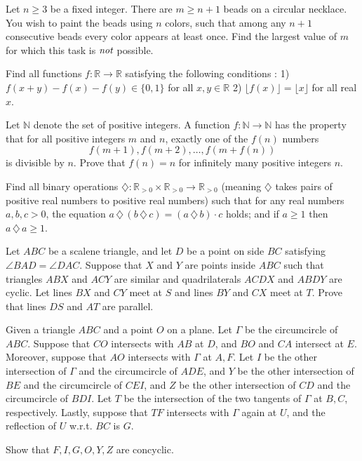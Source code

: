 \documentclass[11pt]{scrartcl}
\begin{document}
\begin{problem}[822921222405372]
Let $n\ge 3$ be a fixed integer. There are $m\ge n+1$ beads on a circular necklace. You wish to paint the beads using $n$ colors, such that among any $n+1$ consecutive beads every color appears at least once. Find the largest value of $m$ for which this task is $\emph{not}$ possible.
\end{problem}
\begin{problem}[549237375256018]
Find all functions $f : \mathbb{R} \rightarrow \mathbb{R}$ satisfying the following conditions :
1) $f(x+y)-f(x)-f(y) \in \{0,1\} $ for all $x,y \in \mathbb{R}$
2) $\lfloor f(x) \rfloor = \lfloor x \rfloor $ for all real $x$.
\end{problem}
\begin{problem}[1598288382590173390]
Let $\mathbb N$ denote the set of positive integers. A function $f\colon\mathbb N\to\mathbb N$ has the property that for all positive integers $m$ and $n$, exactly one of the $f(n)$ numbers
\[f(m+1),f(m+2),\ldots,f(m+f(n))\]is divisible by $n$. Prove that $f(n)=n$ for infinitely many positive integers $n$.
\end{problem}
\begin{problem}[2694660444585153591]
Find all binary operations $\diamondsuit: \mathbb R_{>0}\times \mathbb R_{>0}\to \mathbb R_{>0}$ (meaning $\diamondsuit$ takes pairs of positive real numbers to positive real numbers) such that for any real numbers $a, b, c > 0$,
the equation $a\,\diamondsuit\, (b\,\diamondsuit \,c) = (a\,\diamondsuit \,b)\cdot c$ holds; and
if $a\ge 1$ then $a\,\diamondsuit\, a\ge 1$.
\end{problem}
\begin{problem}[736821043753990]
Let $ABC$ be a scalene triangle, and let $D$ be a point on side $BC$ satisfying $\angle BAD=\angle DAC$. Suppose that $X$ and $Y$ are points inside $ABC$ such that triangles $ABX$ and $ACY$ are similar and quadrilaterals $ACDX$ and $ABDY$ are cyclic. Let lines $BX$ and $CY$ meet at $S$ and lines $BY$ and $CX$ meet at $T$. Prove that lines $DS$ and $AT$ are parallel.
\end{problem}
\begin{problem}[2003233604438068678]
Given a triangle $ABC$ and a point $O$ on a plane. Let $\Gamma$ be the circumcircle of $ABC$. Suppose that $CO$ intersects with $AB$ at $D$, and $BO$ and $CA$ intersect at $E$. Moreover, suppose that $AO$ intersects with $\Gamma$ at $A,F$. Let $I$ be the other intersection of $\Gamma$ and the circumcircle of $ADE$, and $Y$ be the other intersection of $BE$ and the circumcircle of $CEI$, and $Z$ be the other intersection of $CD$ and the circumcircle of $BDI$. Let $T$ be the intersection of the two tangents of $\Gamma$ at $B,C$, respectively. Lastly, suppose that $TF$ intersects with $\Gamma$ again at $U$, and the reflection of $U$ w.r.t. $BC$ is $G$.

Show that $F,I,G,O,Y,Z$ are concyclic.
\end{problem}
\end{document}
